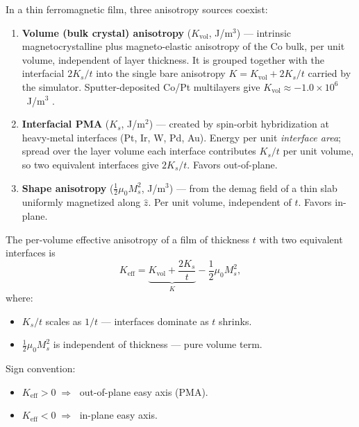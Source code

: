 \documentclass[11pt,a4paper]{article}
\newcommand{\zhat}{\hat{z}}
\newcommand{\Keff}{K_{\text{eff}}}
\newcommand{\Ms}{M_s}
\begin{document}
In a thin ferromagnetic film, three anisotropy sources coexist:
\begin{enumerate}[leftmargin=2em, nosep]
    \item \textbf{Volume (bulk crystal) anisotropy}
        ($K_{\text{vol}}$, J/m$^3$) --- intrinsic
        magnetocrystalline plus magneto-elastic anisotropy
        of the Co bulk, per unit volume, independent of
        layer thickness.  It is grouped together with the
        interfacial $2K_s/t$ into the single bare anisotropy
        $K = K_{\text{vol}} + 2K_s/t$ carried by the simulator.
        Sputter-deposited Co/Pt multilayers give
        $K_{\text{vol}} \approx -1.0 \times 10^6$~J/m$^3$
        \cite{lin1991}.
    \item \textbf{Interfacial PMA} ($K_s$, J/m$^2$) --- created
        by spin-orbit hybridization at heavy-metal interfaces
        (Pt, Ir, W, Pd, Au).  Energy per unit \emph{interface
        area}; spread over the layer volume each interface
        contributes $K_s/t$ per unit volume, so two equivalent
        interfaces give $2K_s/t$.  Favors out-of-plane.
    \item \textbf{Shape anisotropy}
        ($\tfrac{1}{2}\mu_0 \Ms^2$, J/m$^3$) --- from the demag
        field of a thin slab uniformly magnetized along $\zhat$.
        Per unit volume, independent of $t$.  Favors in-plane.
\end{enumerate}

The per-volume effective anisotropy of a film of thickness $t$ with
two equivalent interfaces is
%
\begin{equation}\label{eq:Keff_full}
\Keff = \underbrace{K_{\text{vol}} + \frac{2 K_s}{t}}_{K}
        - \frac{1}{2}\mu_0 \Ms^2,
\end{equation}
%
where:
\begin{itemize}[leftmargin=2em, nosep]
    \item $K_s/t$ scales as $1/t$ --- interfaces dominate as $t$
        shrinks.
    \item $\tfrac{1}{2}\mu_0 \Ms^2$ is independent of thickness ---
        pure volume term.
\end{itemize}

Sign convention:
\begin{itemize}[leftmargin=2em, nosep]
    \item $\Keff > 0 \;\Longrightarrow\;$ out-of-plane easy axis
        (PMA).
    \item $\Keff < 0 \;\Longrightarrow\;$ in-plane easy axis.
\end{itemize}
\end{document}

